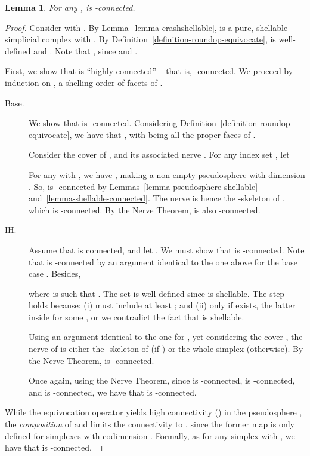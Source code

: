 \documentclass[11pt]{article}
\newtheorem{lemma}[theorem]{Lemma}
\begin{document}
\begin{lemma}
\label{lemma-lasttwo:conn}
For any ,
 is
-connected.
\end{lemma}
\begin{proof}
Consider  with .
By Lemma~\ref{lemma-crashshellable},
 is a pure, shellable simplicial complex with .
By Definition~\ref{definition-roundop-equivocate},
 is well-defined and
.
Note that ,
since  and .

First,
we show that  is ``highly-connected'' -- that is, -connected.
We proceed by induction on ,
a shelling order of facets of .
\begin{description}
	\item[Base.] We show that  is -connected.
Considering Definition~\ref{definition-roundop-equivocate},
we have that ,
with  being all the proper faces of .


Consider the cover  of ,
and its associated nerve .
For any index set ,
let

For any  with ,
we have ,
making  a non-empty pseudosphere
with dimension .
So,  is -connected
by Lemmas~\ref{lemma-pseudosphere-shellable} and~\ref{lemma-shellable-connected}.
The nerve is hence the -skeleton of ,
which is -connected.
By the Nerve Theorem,
 is also -connected.


	\item[IH.] Assume that  is  connected,
and let .
We must show that  is -connected.
Note that  is -connected by an argument identical to the one above for the base case .
Besides,

where  is such that .
The set  is well-defined since  is shellable.
The step  holds because:
(i)  must include at least ;
and (ii)  only if
 exists,
the latter inside 
for some ,
or we contradict the fact that  is shellable.


Using an argument identical to the one for ,
yet considering the cover ,
the nerve of  is either the -skeleton of  (if ) or the whole simplex  (otherwise).
By the Nerve Theorem,
 is -connected.

Once again,
using the Nerve Theorem,
since  is -connected,
 is -connected,
and  is -connected,
we have that  is -connected.
\end{description}
While the equivocation operator yields high connectivity ()
in the pseudosphere ,
the \emph{composition} of  and 
limits the connectivity to ,
since the former map is only defined for simplexes with codimension .
Formally,
as  for any simplex  with ,
we have that  is -connected.
\end{proof}
\end{document}
